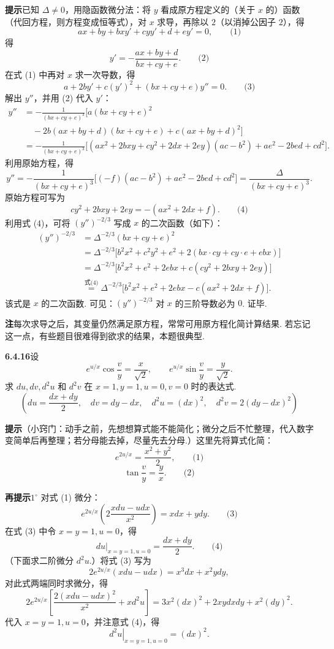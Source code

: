 \documentclass[UTF8,12pt,a4paper,fontset=fandol]{ctexart}
\begin{document}
\noindent\textbf{提示}\quad 已知 $\Delta\ne0$，用隐函数微分法：将 $y$ 看成原方程定义的（关于 $x$ 的）函数（代回方程，则方程变成恒等式），对 $x$ 求导，再除以 $2$（以消掉公因子 $2$），得
\[
  ax+by+bxy'+cyy'+d+ey'=0, \qquad\text{(1)}
\]
得
\[
  y'=-\frac{ax+by+d}{bx+cy+e}. \qquad\text{(2)}
\]
在式 (1) 中再对 $x$ 求一次导数，得
\[
  a+2by'+c(y')^2+(bx+cy+e)y''=0. \qquad\text{(3)}
\]
解出 $y''$，并用 (2) 代入 $y'$：
\[
\begin{aligned}
  y''
  &=-\frac1{(bx+cy+e)^3}
  \bigl[a(bx+cy+e)^2\\
  &\quad -2b(ax+by+d)(bx+cy+e)
  +c(ax+by+d)^2\bigr]\\
  &=-\frac1{(bx+cy+e)^3}
  \bigl[(ax^2+2bxy+cy^2+2dx+2ey)(ac-b^2)
  +ae^2-2bed+cd^2\bigr].
\end{aligned}
\]
利用原始方程，得
\[
  y''=
  -\frac1{(bx+cy+e)^3}
  \bigl[(-f)(ac-b^2)+ae^2-2bed+cd^2\bigr]
  =
  \frac{\Delta}{(bx+cy+e)^3}.
\]
原始方程可写为
\[
  cy^2+2bxy+2ey=-(ax^2+2dx+f). \qquad\text{(4)}
\]
利用式 (4)，可将 $(y'')^{-2/3}$ 写成 $x$ 的二次函数（如下）：
\[
\begin{aligned}
  (y'')^{-2/3}
  &=\Delta^{-2/3}(bx+cy+e)^2\\
  &=\Delta^{-2/3}\bigl[b^2x^2+c^2y^2+e^2+2(bx\cdot cy+cy\cdot e+ebx)\bigr]\\
  &=\Delta^{-2/3}\bigl[b^2x^2+e^2+2ebx+c(cy^2+2bxy+2ey)\bigr]\\
  &\overset{\text{式(4)}}{=}
  \Delta^{-2/3}\bigl[b^2x^2+e^2+2ebx-c(ax^2+2dx+f)\bigr].
\end{aligned}
\]
该式是 $x$ 的二次函数. 可见：$(y'')^{-2/3}$ 对 $x$ 的三阶导数必为 $0$. 证毕.

\noindent\textbf{注}\quad 每次求导之后，其变量仍然满足原方程，常常可用原方程化简计算结果. 若忘记这一点，有些题目很难得到欲求的结果，本题很典型.

\noindent\textbf{6.4.16}\quad 设
\[
  e^{u/x}\cos\frac vy=\frac{x}{\sqrt2},\qquad
  e^{u/x}\sin\frac vy=\frac{y}{\sqrt2}.
\]
求 $du,dv,d^2u$ 和 $d^2v$ 在 $x=1,y=1,u=0,v=0$ 时的表达式.
\[
  \left(du=\frac{dx+dy}{2},\quad dv=dy-dx,\quad
  d^2u=(dx)^2,\quad d^2v=2(dy-dx)^2\right)
\]

\noindent\textbf{提示}\quad （小窍门：动手之前，先想想算式能不能简化；微分之后不忙整理，代入数字变简单后再整理；若分母能去掉，尽量先去分母.）这里先将算式化简：
\[
  e^{2u/x}=\frac{x^2+y^2}{2}, \qquad\text{(1)}
\]
\[
  \tan\frac vy=\frac yx. \qquad\text{(2)}
\]

\noindent\textbf{再提示}\quad $1^\circ$ 对式 (1) 微分：
\[
  e^{2u/x}\left(2\frac{xdu-udx}{x^2}\right)=xdx+ydy. \qquad\text{(3)}
\]
在式 (3) 中令 $x=y=1,u=0$，得
\[
  \left.du\right|_{x=y=1,u=0}=\frac{dx+dy}{2}. \qquad\text{(4)}
\]
（下面求二阶微分 $d^2u$.）将式 (3) 写为
\[
  2e^{2u/x}(xdu-udx)=x^3dx+x^2ydy,
\]
对此式两端同时求微分，得
\[
  2e^{2u/x}\left[\frac{2(xdu-udx)^2}{x^2}+xd^2u\right]
  =
  3x^2(dx)^2+2xydxdy+x^2(dy)^2.
\]
代入 $x=y=1,u=0$，并注意式 (4)，得
\[
  \left.d^2u\right|_{x=y=1,u=0}=(dx)^2.
\]
\end{document}
